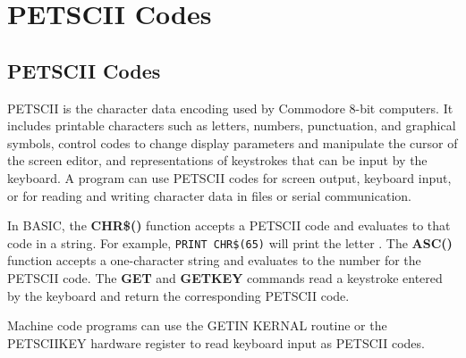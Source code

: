 \chapter{PETSCII Codes}
\label{appendix:petsciicodes}

\section{PETSCII Codes}

PETSCII is the character data encoding used by Commodore 8-bit computers. It includes printable characters such as letters, numbers, punctuation, and graphical symbols, control codes to change display parameters and manipulate the cursor of the screen editor, and representations of keystrokes that can be input by the keyboard. A program can use PETSCII codes for screen output, keyboard input, or for reading and writing character data in files or serial communication.

In BASIC, the \textbf{CHR\$()} function accepts a PETSCII code and evaluates to that code in a string. For example, \texttt{PRINT CHR\$(65)} will print the letter . The \textbf{ASC()} function accepts a one-character string and evaluates to the number for the PETSCII code. The \textbf{GET} and \textbf{GETKEY} commands read a keystroke entered by the keyboard and return the corresponding PETSCII code.

Machine code programs can use the GETIN KERNAL routine or the PETSCIIKEY hardware register to read keyboard input as PETSCII codes.

